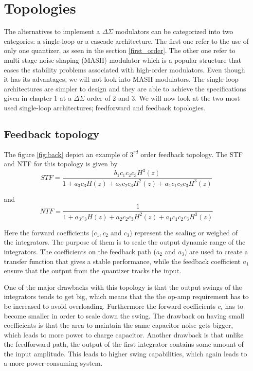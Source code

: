 \section{Topologies}
The alternatives to implement a $\Delta\Sigma$ modulators can be categorized into two categories: a single-loop or a cascade architecture. The first one refer to the use of only one quantizer, as seen in the section \ref{first_order}. The other one refer to multi-stage noise-shaping (MASH) modulator which is a popular structure that eases the stability problems associated with high-order modulators. Even though it has its advantages, we will not look into MASH modulators. The single-loop architectures are simpler to design and they are able to achieve the specifications given in chapter 1 at a $\Delta\Sigma$ order of 2 and 3. We will now look at the two most used single-loop architectures; feedforward and feedback topologies. 

\subsection{Feedback topology}
The figure \ref{fig:back} depict an example of $3^{rd}$ order feedback topology. The STF and NTF for this topology is given by
\begin{equation}
    STF = \frac{b_1c_1c_2c_3H^3(z)}{1 + a_3c_3H(z) + a_2c_2c_3H^2(z) + a_1c_1c_2c_3H^3(z)}
\end{equation}

and
\begin{equation}
    NTF = \frac{1}{1 + a_3c_3H(z) + a_2c_2c_3H^2(z) + a_1c_1c_2c_3H^3(z)}
\end{equation}

Here the forward coefficients ($c_1, c_2$ and $c_3$) represent the scaling or weighed of the integrators. The purpose of them is to scale the output dynamic range of the integrators. The coefficients on the feedback path ($a_2$ and $a_3$) are used to create a transfer function that gives a stable performance, while the feedback coefficient $a_1$ ensure that the output from the quantizer tracks the input.

One of the major drawbacks with this topology is that the output swings of the integrators tends to get big, which
means that the the op-amp requirement has to be increased to avoid overloading. Furthermore the forward coefficients $c_i$ has to become smaller in order to scale down the swing. The drawback on having small coefficients is that the area to maintain the same capacitor noise gets bigger, which leads to more power to charge capacitor. Another drawback is that unlike the feedforward-path, the output of the first integrator contains some amount of the input amplitude. This leads to higher swing capabilities, which again leads to a more power-consuming system.   

